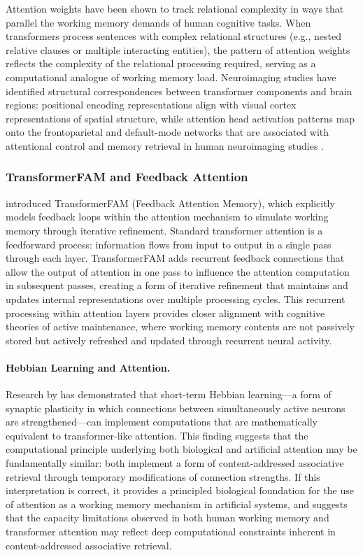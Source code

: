 \documentclass[11pt,letterpaper]{article}
\begin{document}
Attention weights have been shown to track relational complexity in ways that parallel the working memory demands of human cognitive tasks. When transformers process sentences with complex relational structures (e.g., nested relative clauses or multiple interacting entities), the pattern of attention weights reflects the complexity of the relational processing required, serving as a computational analogue of working memory load. Neuroimaging studies have identified structural correspondences between transformer components and brain regions: positional encoding representations align with visual cortex representations of spatial structure, while attention head activation patterns map onto the frontoparietal and default-mode networks that are associated with attentional control and memory retrieval in human neuroimaging studies \cite{nikolaev2025aligning}.

\subsubsection{TransformerFAM and Feedback Attention}

\cite{irie2024transformerfam} introduced TransformerFAM (Feedback Attention Memory), which explicitly models feedback loops within the attention mechanism to simulate working memory through iterative refinement. Standard transformer attention is a feedforward process: information flows from input to output in a single pass through each layer. TransformerFAM adds recurrent feedback connections that allow the output of attention in one pass to influence the attention computation in subsequent passes, creating a form of iterative refinement that maintains and updates internal representations over multiple processing cycles. This recurrent processing within attention layers provides closer alignment with cognitive theories of active maintenance, where working memory contents are not passively stored but actively refreshed and updated through recurrent neural activity.

\paragraph{Hebbian Learning and Attention.} Research by \cite{kozachkov2022hebbian} has demonstrated that short-term Hebbian learning---a form of synaptic plasticity in which connections between simultaneously active neurons are strengthened---can implement computations that are mathematically equivalent to transformer-like attention. This finding suggests that the computational principle underlying both biological and artificial attention may be fundamentally similar: both implement a form of content-addressed associative retrieval through temporary modifications of connection strengths. If this interpretation is correct, it provides a principled biological foundation for the use of attention as a working memory mechanism in artificial systems, and suggests that the capacity limitations observed in both human working memory and transformer attention may reflect deep computational constraints inherent in content-addressed associative retrieval.
\end{document}

